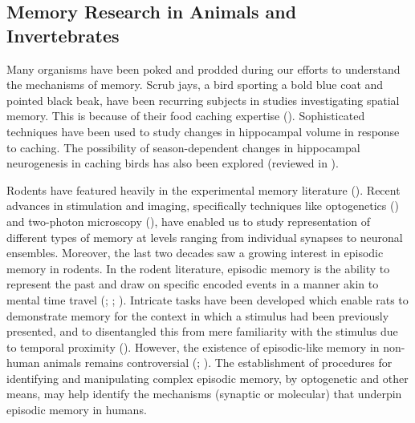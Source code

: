 \documentclass[
  jou,
  floatsintext,
  longtable,
  nolmodern,
  notxfonts,
  notimes,
  donotrepeattitle,
  colorlinks=true,linkcolor=blue,citecolor=blue,urlcolor=blue]{apa7}
\begin{document}
\subsection{Memory Research in Animals and
Invertebrates}\label{memory-research-in-animals-and-invertebrates}

Many organisms have been poked and prodded during our efforts to
understand the mechanisms of memory. Scrub jays, a bird sporting a bold
blue coat and pointed black beak, have been recurring subjects in
studies investigating spatial memory. This is because of their food
caching expertise (). Sophisticated techniques have been used to study changes
in hippocampal volume in response to caching. The possibility of
season-dependent changes in hippocampal neurogenesis in caching birds
has also been explored (reviewed in
).

Rodents have featured heavily in the experimental memory literature
(). Recent advances in stimulation and imaging, specifically
techniques like optogenetics
() and two-photon
microscopy (),
have enabled us to study representation of different types of memory at
levels ranging from individual synapses to neuronal ensembles. Moreover,
the last two decades saw a growing interest in episodic memory in
rodents. In the rodent literature, episodic memory is the ability to
represent the past and draw on specific encoded events in a manner akin
to mental time travel (; ;
). Intricate tasks
have been developed which enable rats to demonstrate memory for the
context in which a stimulus had been previously presented, and to
disentangled this from mere familiarity with the stimulus due to
temporal proximity (). However, the existence of episodic-like memory in non-human
animals remains controversial (; ). The establishment of procedures for identifying and manipulating
complex episodic memory, by optogenetic and other means, may help
identify the mechanisms (synaptic or molecular) that underpin episodic
memory in humans.
\end{document}
